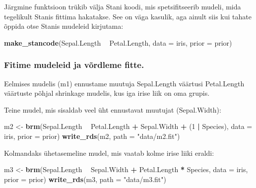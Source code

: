 \documentclass[]{article}
\newenvironment{Shaded}{\begin{snugshade}}{\end{snugshade}}
\newcommand{\KeywordTok}[1]{\textcolor[rgb]{0.13,0.29,0.53}{\textbf{#1}}}
\newcommand{\DataTypeTok}[1]{\textcolor[rgb]{0.13,0.29,0.53}{#1}}
\newcommand{\DecValTok}[1]{\textcolor[rgb]{0.00,0.00,0.81}{#1}}
\newcommand{\StringTok}[1]{\textcolor[rgb]{0.31,0.60,0.02}{#1}}
\newcommand{\OperatorTok}[1]{\textcolor[rgb]{0.81,0.36,0.00}{\textbf{#1}}}
\newcommand{\NormalTok}[1]{#1}
\begin{document}
Järgmine funktsioon trükib välja Stani koodi, mis spetsifitseerib
mudeli, mida tegelikult Stanis fittima hakatakse. See on väga kasulik,
aga ainult siis kui tahate õppida otse Stanis mudeleid kirjutama:

\begin{Shaded}
\begin{Highlighting}[]
\KeywordTok{make_stancode}\NormalTok{(Sepal.Length }\OperatorTok{~}\StringTok{ }\NormalTok{Petal.Length, }\DataTypeTok{data =}\NormalTok{ iris, }\DataTypeTok{prior =}\NormalTok{ prior)}
\end{Highlighting}
\end{Shaded}

\subsubsection{Fitime mudeleid ja võrdleme
fitte.}\label{fitime-mudeleid-ja-vordleme-fitte.}

Eelmises mudelis (m1) ennustame muutuja Sepal.Length väärtusi
Petal.Length väärtuste põhjal shrinkage mudelis, kus iga irise liik on
oma grupis.

Teine mudel, mis sisaldab veel üht ennustavat muutujat (Sepal.Width):

\begin{Shaded}
\begin{Highlighting}[]
\NormalTok{m2 <-}\StringTok{ }\KeywordTok{brm}\NormalTok{(Sepal.Length }\OperatorTok{~}\StringTok{ }\NormalTok{Petal.Length }\OperatorTok{+}\StringTok{ }\NormalTok{Sepal.Width }\OperatorTok{+}\StringTok{ }\NormalTok{(}\DecValTok{1} \OperatorTok{|}\StringTok{ }\NormalTok{Species), }
          \DataTypeTok{data =}\NormalTok{ iris, }
          \DataTypeTok{prior =}\NormalTok{ prior)}
\KeywordTok{write_rds}\NormalTok{(m2, }\DataTypeTok{path =} \StringTok{"data/m2.fit"}\NormalTok{)}
\end{Highlighting}
\end{Shaded}

Kolmandaks ühetasemeline mudel, mis vaatab kolme irise liiki eraldi:

\begin{Shaded}
\begin{Highlighting}[]
\NormalTok{m3 <-}\StringTok{ }\KeywordTok{brm}\NormalTok{(Sepal.Length }\OperatorTok{~}\StringTok{ }\NormalTok{Sepal.Width }\OperatorTok{+}\StringTok{ }\NormalTok{Petal.Length }\OperatorTok{*}\StringTok{ }\NormalTok{Species, }
          \DataTypeTok{data =}\NormalTok{ iris, }
          \DataTypeTok{prior =}\NormalTok{ prior)}
\KeywordTok{write_rds}\NormalTok{(m3, }\DataTypeTok{path =} \StringTok{"data/m3.fit"}\NormalTok{)}
\end{Highlighting}
\end{Shaded}
\end{document}
